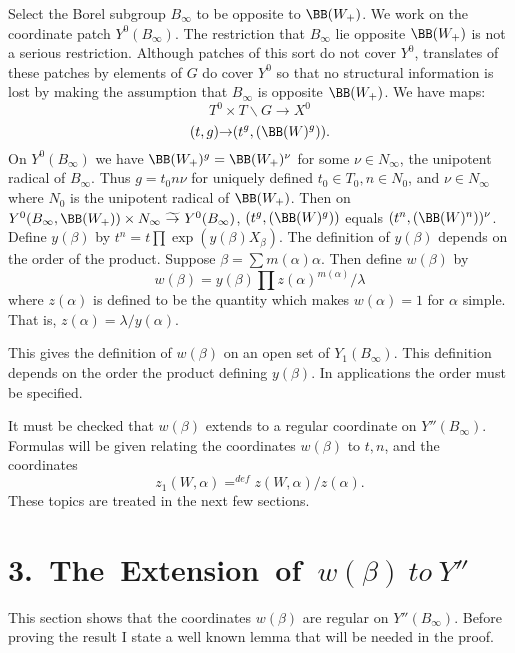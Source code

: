 \documentclass{memo-l}
\theoremstyle{definition}
\theoremstyle{remark}
\numberwithin{section}{chapter}
\numberwithin{equation}{chapter}
\begin{document}
   Select the Borel subgroup $B_{{\infty}}$ to be opposite to 
${\BB}(W_{+})$. 
 We work on the coordinate patch $Y^{0}(B_{{\infty}})$. 
 The restriction that $B_{{\infty}}$ lie opposite ${\BB}(W_{+})$ is not a 
serious restriction. 
 Although patches of this sort do not cover $Y^{0}$, translates of these 
patches by elements of $G$ do cover $Y^{0}$ so that no structural information 
is lost by making the assumption that $B_{{\infty}}$ is opposite 
${\BB}(W_{+})$. 
 We have maps:
$$
T^{0} \times T\backslash G {\to} X^{0}
$$
$$
(t,g) {\to} (t^{g},({\BB}(W)^{g})) .
$$
On $Y^{0}(B_{{\infty}})$ we have ${\BB}(W_{+})^{g} = 
{\BB}(W_{+})^{{\nu}}$ for some ${\nu} \in N_{{\infty}}$, the unipotent 
radical of $B_{{\infty}}$. 
 Thus $g=t_{0}n{\nu}$ for uniquely defined $t_{0} \in T_{0}, n \in N_{0}$, 
and ${\nu} \in N_{{\infty}}$ where $N_{0}$ is the unipotent radical of 
${\BB}(W_{+})$. 
 Then on $Y^{0}(B_{{\infty}},{\BB}(W_{+})) \times N_{{\infty}}\
{\widetilde{\to}}\  Y^{0}(B_{{\infty}})$, $(t^{g},({\BB}(W)^{g}))$ equals 
$(t^{n},({\BB}(W)^{n}))^{{\nu}}$. 
 Define $y({\beta})$ by $t^{n} = t \prod \exp(y({\beta})X_{{\beta}})$. 
 The definition of $y({\beta})$ depends on the order of the product. 
 Suppose ${\beta} = \sum m({\alpha}){\alpha}$. 
 Then define $w({\beta})$ by
$$
w({\beta}) = y({\beta})
\prod z({\alpha})^{m({\alpha})}/{\lambda}
$$
where $z({\alpha})$ is defined to be the quantity which makes $w({\alpha}) = 1$ 
for ${\alpha}$ simple. 
 That is, $z({\alpha}) = {\lambda}/y({\alpha})$.

   This gives the definition of $w({\beta})$ on an open set of 
$Y_{1}(B_{{\infty}})$. 
 This definition depends on the order the product defining $y({\beta})$. 
 In applications the order must be specified. 
 

   It must be checked that $w({\beta})$ extends to a regular coordinate on 
$Y''(B_{{\infty}})$. 
 Formulas will be given relating the coordinates $w({\beta})$ to $t, n$, and 
the coordinates $$z_{1}(W,{\alpha}) =^{def} 
z(W,{\alpha})/z({\alpha}).$$ 
 These topics are treated in the next few sections.

\section{ 3.\  The\ Extension\ of\ $w({\beta})\ to\ Y''$}

   This section shows that the coordinates $w({\beta})$ are regular on 
$Y''(B_{{\infty}})$. 
 Before proving the result I state a well known lemma that will be needed in 
the proof.
\end{document}
